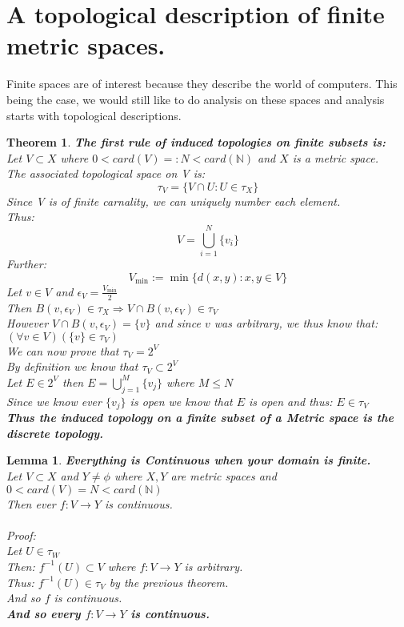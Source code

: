 \documentclass[12pt]{extarticle}
\theoremstyle{plain}
\newtheorem{thm}{Theorem}[section]
\theoremstyle{plain}
\newtheorem{lma}{Lemma}[section]
\theoremstyle{Definition}
\theoremstyle{Definition}
\theoremstyle{plain}
\begin{document}
	\section{A topological description of finite metric spaces.}
	Finite spaces are of interest because they describe the world of computers. This being the case, we would still like to do analysis on these spaces and analysis starts with topological descriptions. 
	\begin{thm} \textbf{The first rule of induced topologies on finite subsets is:} \\
		Let $V \subset X$ where $0 < card(V) =: N < card(\mathbb{N})$ and $X$ is a metric space. \\
		The associated topological space on V is: 
		$$\tau_V = \{V \cap U : U \in \tau_X\}$$
		Since V is of finite carnality, we can uniquely number each element. \\ 
		Thus:
		$$V = \bigcup_{i=1}^N \{v_i\}$$
		Further: 
		$$V_{\min} := \min\{d(x,y) : x,y \in V\} $$
		Let $v \in V$ and $\epsilon_V = \frac{V_{\min}}{2}$ \\ 
		Then $B(v,\epsilon_V) \in \tau_X \Rightarrow V \cap B(v,\epsilon_V) \in \tau_V$ \\ 
		However $V \cap B(v,\epsilon_V)  = \{v\}$ and since $v$ was arbitrary, we thus know that: $(\forall v \in V)(\{v\} \in \tau_V)$ \\
		We can now prove that $\tau_V = 2^V$ \\ 
		By definition we know that $\tau_V \subset 2^V$ \\ 
		Let $E \in 2^V$ then $E = \bigcup_{j=1}^M \{v_j\}$ where $M \leq N$ \\ 
		Since we know ever $\{v_j\}$ is open we know that $E$ is open and thus: $E \in \tau_V$ \\ 
		\textbf{Thus the induced topology on a finite subset of a Metric space is the discrete topology. }		
	\end{thm}
	\begin{lma} \textbf{Everything is Continuous when your domain is finite.} \\ 
			Let $V \subset X$ and $Y \not = \phi$ where $X,Y$ are metric spaces and $0 < card(V) = N < card(\mathbb{N})$ \\
			Then ever $f : V \to Y$ is continuous. \\ \\
			Proof: \\ 
			Let $U \in \tau_W$ \\ 
			Then: $f^{-1}(U) \subset V$ where $f : V \to Y$ is arbitrary. \\
			Thus: $f^{-1}(U) \in \tau_V$ by the previous theorem. \\
			And so $f$ is continuous. \\
			\textbf{And so every $f : V \to Y$ is continuous. }
	\end{lma}
	
\end{document}
